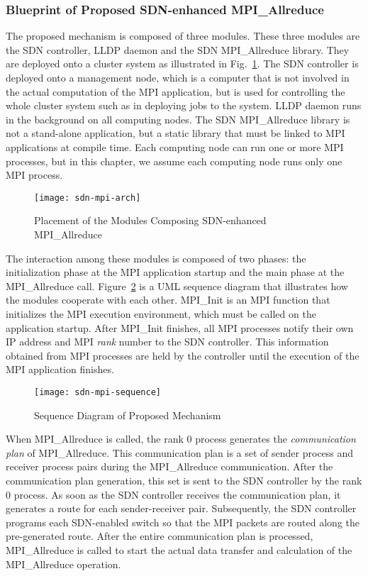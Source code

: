 \subsubsection{Blueprint of Proposed SDN-enhanced MPI\_Allreduce}

The proposed mechanism is composed of three modules. These three modules are
the SDN controller, LLDP daemon and the SDN MPI\_Allreduce library. They are
deployed onto a cluster system as illustrated in
Fig.~\ref{fig:proposal-placement}. The SDN controller is deployed onto a
management node, which is a computer that is not involved in the actual
computation of the MPI application, but is used for controlling the whole
cluster system such as in deploying jobs to the system. LLDP daemon runs in
the background on all computing nodes. The SDN MPI\_Allreduce library is not a
stand-alone application, but a static library that must be linked to MPI
applications at compile time. Each computing node can run one or more MPI
processes, but in this chapter, we assume each computing node runs only one MPI
process.

\begin{figure}
    \centering
    \texttt{[image: sdn-mpi-arch]}
    \caption{Placement of the Modules Composing SDN-enhanced MPI\_Allreduce}%
    \label{fig:proposal-placement}
\end{figure}

The interaction among these modules is composed of two phases: the
initialization phase at the MPI application startup and the main phase at the
MPI\_Allreduce call. Figure~\ref{fig:proposal-sequence} is a UML sequence
diagram that illustrates how the modules cooperate with each other. MPI\_Init
is an MPI function that initializes the MPI execution environment, which must
be called on the application startup. After MPI\_Init finishes, all MPI
processes notify their own IP address and MPI \emph{rank} number to the SDN
controller. This information obtained from MPI processes are held by the
controller until the execution of the MPI application finishes.

\begin{figure}
    \centering
    \texttt{[image: sdn-mpi-sequence]}
    \caption{Sequence Diagram of Proposed Mechanism}%
    \label{fig:proposal-sequence}
\end{figure}

When MPI\_Allreduce is called, the rank 0 process generates the
\emph{communication plan} of MPI\_Allreduce. This communication plan is a set
of sender process and receiver process pairs during the MPI\_Allreduce
communication. After the communication plan generation, this set is sent to
the SDN controller by the rank 0 process. As soon as the SDN controller
receives the communication plan, it generates a route for each sender-receiver
pair. Subsequently, the SDN controller programs each SDN-enabled switch so
that the MPI packets are routed along the pre-generated route. After the
entire communication plan is processed, MPI\_Allreduce is called to start the
actual data transfer and calculation of the MPI\_Allreduce operation.

